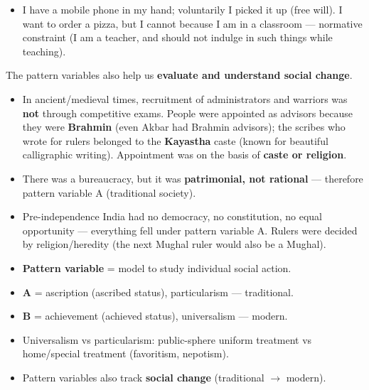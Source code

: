 \begin{ExampleBox}
\begin{itemize}
\item I have a mobile phone in my hand; voluntarily I picked it up (free will). I want to order a pizza, but I cannot because I am in a classroom --- normative constraint (I am a teacher, and should not indulge in such things while teaching).
\end{itemize}
\end{ExampleBox}

The pattern variables also help us \textbf{evaluate and understand social change}.

\begin{DataFact}
\begin{itemize}
\item In ancient/medieval times, recruitment of administrators and warriors was \textbf{not} through competitive exams. People were appointed as advisors because they were \textbf{Brahmin} (even Akbar had Brahmin advisors); the scribes who wrote for rulers belonged to the \textbf{Kayastha} caste (known for beautiful calligraphic writing). Appointment was on the basis of \textbf{caste or religion}.
\item There was a bureaucracy, but it was \textbf{patrimonial, not rational} --- therefore pattern variable A (traditional society).
\item Pre-independence India had no democracy, no constitution, no equal opportunity --- everything fell under pattern variable A. Rulers were decided by religion/heredity (the next Mughal ruler would also be a Mughal).
\end{itemize}
\end{DataFact}

\begin{QuickRevision}
\begin{itemize}
\item \textbf{Pattern variable} = model to study individual social action.
\item \textbf{A} = ascription (ascribed status), particularism --- traditional.
\item \textbf{B} = achievement (achieved status), universalism --- modern.
\item Universalism vs particularism: public-sphere uniform treatment vs home/special treatment (favoritism, nepotism).
\item Pattern variables also track \textbf{social change} (traditional $\rightarrow$ modern).
\end{itemize}
\end{QuickRevision}

